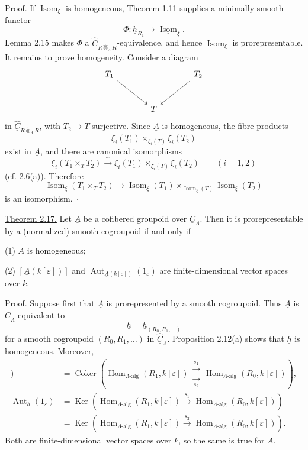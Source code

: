 \underline{Proof.} If $\operatorname{Isom}_\xi$ is homogeneous,
Theorem 1.11 supplies a minimally smooth functor
\[
 \Phi:\underline h_{R_1}\longrightarrow
 \underline{\operatorname{Isom}}_\xi.
\]
Lemma 2.15 makes $\Phi$ a
$\widehat{\underline C}_{R\widehat\otimes_\Lambda R}$-equivalence,
and hence $\operatorname{Isom}_\xi$ is prorepresentable. It remains
to prove homogeneity. Consider a diagram
\[
\begin{tikzcd}[column sep=large,row sep=large]
 T_1 \arrow[dr] && T_2 \arrow[dl]\\
 & T &
\end{tikzcd}
\]
in $\widehat{\underline C}_{R\widehat\otimes_\Lambda R}$, with
$T_2\longrightarrow T$ surjective. Since $\underline A$ is
homogeneous, the fibre products
\[
 \xi_i(T_1)\times_{\xi_i(T)}\xi_i(T_2)
\]
exist in $\underline A$, and there are canonical isomorphisms
\[
 \xi_i(T_1\times_TT_2)\xrightarrow{\ \sim\ }
 \xi_i(T_1)\times_{\xi_i(T)}\xi_i(T_2)
 \qquad(i=1,2)
\]
(cf. 2.6(a)). Therefore
\[
 \operatorname{Isom}_\xi(T_1\times_TT_2)
 \longrightarrow
 \operatorname{Isom}_\xi(T_1)
 \times_{\operatorname{Isom}_\xi(T)}
 \operatorname{Isom}_\xi(T_2)
\]
is an isomorphism. \hfill$\square$

\underline{Theorem 2.17.} Let $\underline A$ be a cofibered groupoid
over $\underline C_\Lambda$. Then it is prorepresentable by a
(normalized) smooth cogroupoid if and only if


(1) $\underline A$ is homogeneous;

(2) $[\underline A(k[\varepsilon])]$ and
$\operatorname{Aut}_{\underline A(k[\varepsilon])}(1_\varepsilon)$
are finite-dimensional vector spaces over $k$.

\underline{Proof.} Suppose first that $\underline A$ is
prorepresented by a smooth cogroupoid. Thus $\underline A$ is
$\underline C_\Lambda$-equivalent to
\[
 \underline h=\underline h_{(R_0,R_1,\ldots)}
\]
for a smooth cogroupoid $(R_0,R_1,\ldots)$ in
$\widehat{\underline C}_\Lambda$. Proposition 2.12(a) shows that
$\underline h$ is homogeneous. Moreover,
\begin{align*}
 [\underline h(k[\varepsilon])]
 &=\operatorname{Coker}\!\left(
   \operatorname{Hom}_{\Lambda\text{-alg}}(R_1,k[\varepsilon])
   \mathrel{\substack{\xrightarrow{\ s_1\ }\\[-.6ex]
                       \xrightarrow[\ s_2\ ]{}}}
   \operatorname{Hom}_{\Lambda\text{-alg}}(R_0,k[\varepsilon])
   \right),\\[1ex]
 \operatorname{Aut}_{\underline h}(1_\varepsilon)
 &=\operatorname{Ker}\!\left(
   \operatorname{Hom}_{\Lambda\text{-alg}}(R_1,k[\varepsilon])
   \xrightarrow{\ s_1\ }
   \operatorname{Hom}_{\Lambda\text{-alg}}(R_0,k[\varepsilon])
   \right)\\
 &=\operatorname{Ker}\!\left(
   \operatorname{Hom}_{\Lambda\text{-alg}}(R_1,k[\varepsilon])
   \xrightarrow{\ s_2\ }
   \operatorname{Hom}_{\Lambda\text{-alg}}(R_0,k[\varepsilon])
   \right).
\end{align*}
Both are finite-dimensional vector spaces over $k$, so the same is
true for $\underline A$.

